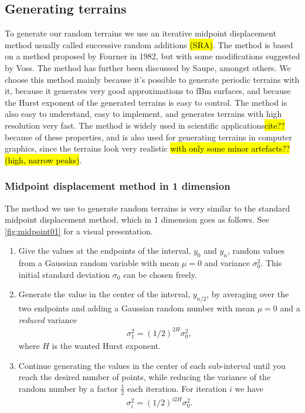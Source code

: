 \subsection{Generating terrains}

To generate our random terrains we use an iterative midpoint displacement method usually called successive random additions \hl{(SRA)}. The method is based on a method proposed by Fourner in 1982\cite{fournier1982computer}, but with some modifications suggested by Voss\cite{voss1985random, voss1988fractals}. The method has further been discussed by Saupe\cite{saupe1988algorithms}, amongst others. We choose this method mainly because it's possible to generate periodic terrains with it, because it generates very good approximations to fBm surfaces\cite{zhou2005comparison}, and because the Hurst exponent of the generated terrains is easy to control. The method is also easy to understand, easy to implement, and generates terrains with high resolution very fast. The method is widely used in scientific applications\hl{cite??} because of these properties, and is also used for generating terrains in computer graphics, since the terrains look very realistic \hl{with only some minor artefacts?? (high, narrow peaks)}.

\subsubsection{Midpoint displacement method in 1 dimension}
The method we use to generate random terrains is very similar to the standard midpoint displacement method, which in 1 dimension goes as follows. See \cref{fig:midpoint01} for a visual presentation.
\begin{enumerate}
    \item Give the values at the endpoints of the interval, $y_0$ and $y_n$, random values from a Gaussian random variable with mean $\mu = 0$ and variance $\sigma_0^2$. This initial standard deviation $\sigma_0$ can be chosen freely.
    \item Generate the value in the center of the interval, $y_{n/2}$, by averaging over the two endpoints and adding a Gaussian random number with mean $\mu = 0$ and a \emph{reduced} variance
    \begin{align}
         \sigma_1^2 = \left(1/2\right)^{2H}\sigma_0^2, \label{eq:midpoint_sigma_first}
    \end{align}
    where $H$ is the wanted Hurst exponent.
    \item Continue generating the values in the center of each sub-interval until you reach the desired number of points, while reducing the variance of the random number by a factor $\frac{1}{2}$ each iteration. For iteration $i$ we have
    \begin{align}
        \sigma_i^2 = \left(1/2\right)^{i2H}\sigma_0^2. \label{eq:midpoint_sigma_general}
    \end{align}
\end{enumerate}

